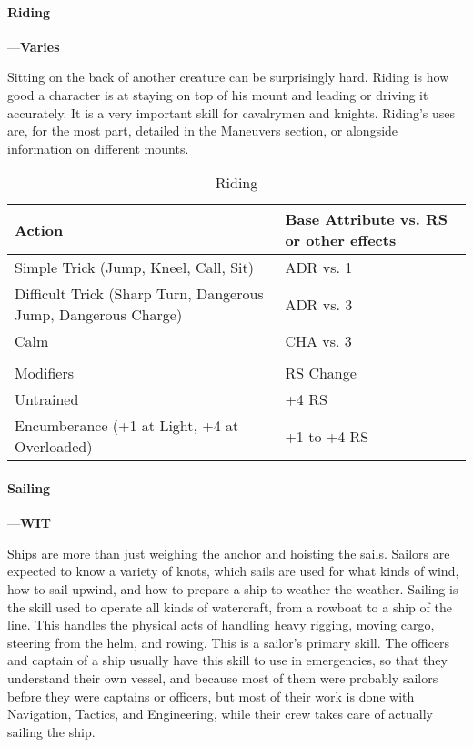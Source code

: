\documentclass[oneside,11pt,english]{book}
\begin{document}
\paragraph{\label{skill:Riding}Riding}---\quad\textbf{Varies}\par
Sitting on the back of another creature can be surprisingly hard. Riding is how good a character is at staying on top of his mount and leading or driving it accurately. It is a very important skill for cavalrymen and knights. Riding’s uses are, for the most part, detailed in the Maneuvers section, or alongside information on different mounts.

\begin{longtabu} to \linewidth{X[1.5]X[r]}
	\caption{Riding}
	\label{tab:Riding}\\
	\rowfont[c]{}Action &Base Attribute vs. RS or other effects\\\toprule
Simple Trick (Jump, Kneel, Call, Sit) &ADR vs. 1\\
Difficult Trick (Sharp Turn, Dangerous Jump, Dangerous Charge) &ADR vs. 3 \\
Calm &CHA vs. 3\\
	\\
		\rowfont[c]{}Modifiers &RS Change\\
Untrained&+4 RS\\
Encumberance (+1 at Light, +4 at Overloaded)&+1 to +4 RS \\
\end{longtabu}

\paragraph{\label{skill:Sailing}Sailing}---\quad\textbf{WIT}\par
Ships are more than just weighing the anchor and hoisting the sails. Sailors are expected to know a variety of knots, which sails are used for what kinds of wind, how to sail upwind, and how to prepare a ship to weather the weather. Sailing is the skill used to operate all kinds of watercraft, from a rowboat to a ship of the line. This handles the physical acts of handling heavy rigging, moving cargo, steering from the helm, and rowing. This is a sailor’s primary skill. The officers and captain of a ship usually have this skill to use in emergencies, so that they understand their own vessel, and because most of them were probably sailors before they were captains or officers, but most of their work is done with Navigation, Tactics, and Engineering, while their crew takes care of actually sailing the ship.
\end{document}
